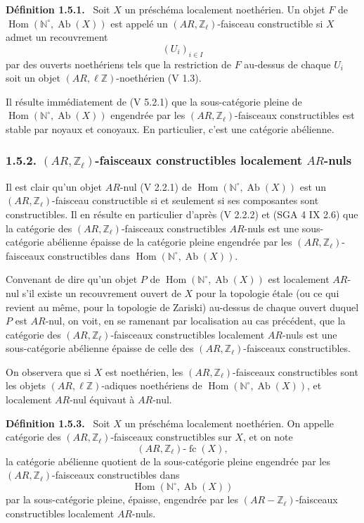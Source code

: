 \documentclass[11pt]{article}
\newenvironment{statement}[1]{\par\medskip\noindent\textbf{#1.}\ }{\par\medskip}
\DeclareMathOperator{\Hom}{Hom}
\providecommand{\Hom}{\operatorname{Hom}}
\providecommand{\Ab}{\operatorname{Ab}}
\providecommand{\fc}{\operatorname{fc}}
\providecommand{\Ab}{\operatorname{Ab}}
\providecommand{\Hom}{\operatorname{Hom}}
\begin{document}
\begin{statement}{Définition 1.5.1}
Soit \(X\) un préschéma localement noethérien. Un objet \(F\) de \(\Hom(\mathbb N^\circ,\Ab(X))\) est appelé un \((AR,\mathbb Z_\ell)\)-faisceau constructible si \(X\) admet un recouvrement
\[
(U_i)_{i\in I}
\]
par des ouverts noethériens tels que la restriction de \(F\) au-dessus de chaque \(U_i\) soit un objet \((AR,\ell\mathbb Z)\)-noethérien (V 1.3).
\end{statement}

Il résulte immédiatement de (V 5.2.1) que la sous-catégorie pleine de \(\Hom(\mathbb N^\circ,\Ab(X))\) engendrée par les \((AR,\mathbb Z_\ell)\)-faisceaux constructibles est stable par noyaux et conoyaux. En particulier, c'est une catégorie abélienne.

\subsubsection*{1.5.2. \((AR,\mathbb Z_\ell)\)-faisceaux constructibles localement \(AR\)-nuls}

Il est clair qu'un objet \(AR\)-nul (V 2.2.1) de \(\Hom(\mathbb N^\circ,\Ab(X))\) est un \((AR,\mathbb Z_\ell)\)-faisceau constructible si et seulement si ses composantes sont constructibles. Il en résulte en particulier d'après (V 2.2.2) et (SGA 4 IX 2.6) que la catégorie des \((AR,\mathbb Z_\ell)\)-faisceaux constructibles \(AR\)-nuls est une sous-catégorie abélienne épaisse de la catégorie pleine engendrée par les \((AR,\mathbb Z_\ell)\)-faisceaux constructibles dans \(\Hom(\mathbb N^\circ,\Ab(X))\).

Convenant de dire qu'un objet \(P\) de \(\Hom(\mathbb N^\circ,\Ab(X))\) est localement \(AR\)-nul s'il existe un recouvrement ouvert de \(X\) pour la topologie étale (ou ce qui revient au même, pour la topologie de Zariski) au-dessus de chaque ouvert duquel \(P\) est \(AR\)-nul, on voit, en se ramenant par localisation au cas précédent, que la catégorie des \((AR,\mathbb Z_\ell)\)-faisceaux constructibles localement \(AR\)-nuls est une sous-catégorie abélienne épaisse de celle des \((AR,\mathbb Z_\ell)\)-faisceaux constructibles.

On observera que si \(X\) est noethérien, les \((AR,\mathbb Z_\ell)\)-faisceaux constructibles sont les objets \((AR,\ell\mathbb Z)\)-adiques noethériens de \(\Hom(\mathbb N^\circ,\Ab(X))\), et localement \(AR\)-nul équivaut à \(AR\)-nul.

\begin{statement}{Définition 1.5.3}
Soit \(X\) un préschéma localement noethérien. On appelle catégorie des \((AR,\mathbb Z_\ell)\)-faisceaux constructibles sur \(X\), et on note
\[
(AR,\mathbb Z_\ell)\text{-}\fc(X),
\]
la catégorie abélienne quotient de la sous-catégorie pleine engendrée par les \((AR,\mathbb Z_\ell)\)-faisceaux constructibles dans
\[
\Hom(\mathbb N^\circ,\Ab(X))
\]
par la sous-catégorie pleine, épaisse, engendrée par les \((AR-\mathbb Z_\ell)\)-faisceaux constructibles localement \(AR\)-nuls.
\end{statement}
\end{document}
